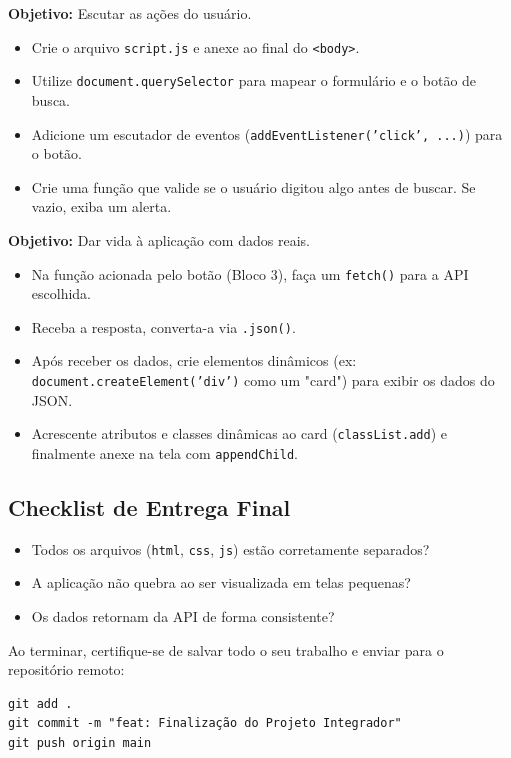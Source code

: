 \documentclass[12pt,a4paper]{article}
\begin{document}
\begin{boxAtividade}
\textbf{Objetivo:} Escutar as ações do usuário.
\begin{itemize}
    \item Crie o arquivo \texttt{script.js} e anexe ao final do \texttt{<body>}.
    \item Utilize \texttt{document.querySelector} para mapear o formulário e o botão de busca.
    \item Adicione um escutador de eventos (\texttt{addEventListener('click', ...)}) para o botão.
    \item Crie uma função que valide se o usuário digitou algo antes de buscar. Se vazio, exiba um alerta.
\end{itemize}
\end{boxAtividade}

\begin{boxAtividade}
\textbf{Objetivo:} Dar vida à aplicação com dados reais.
\begin{itemize}
    \item Na função acionada pelo botão (Bloco 3), faça um \texttt{fetch()} para a API escolhida.
    \item Receba a resposta, converta-a via \texttt{.json()}.
    \item Após receber os dados, crie elementos dinâmicos (ex: \texttt{document.createElement('div')} como um "card") para exibir os dados do JSON.
    \item Acrescente atributos e classes dinâmicas ao card (\texttt{classList.add}) e finalmente anexe na tela com \texttt{appendChild}.
\end{itemize}
\end{boxAtividade}

\subsection{Checklist de Entrega Final}

\begin{boxAtividade}
\begin{itemize}
    \item Todos os arquivos (\texttt{html}, \texttt{css}, \texttt{js}) estão corretamente separados?
    \item A aplicação não quebra ao ser visualizada em telas pequenas?
    \item Os dados retornam da API de forma consistente?
\end{itemize}

Ao terminar, certifique-se de salvar todo o seu trabalho e enviar para o repositório remoto:
\begin{boxCodigo}
\begin{verbatim}
git add .
git commit -m "feat: Finalização do Projeto Integrador"
git push origin main
\end{verbatim}
\end{boxCodigo}
\end{boxAtividade}
\end{document}
